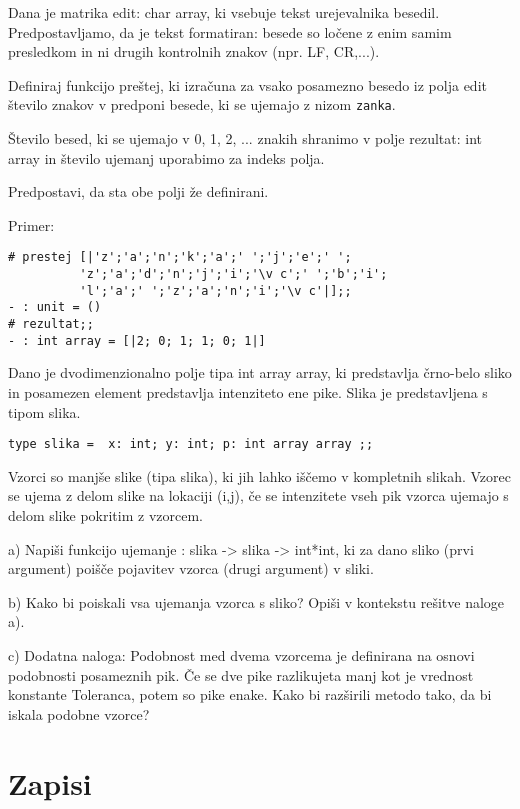 \begin{ex}
Dana je matrika edit: char array, ki vsebuje tekst urejevalnika besedil. Predpostavljamo, da je tekst formatiran: besede so lo\v cene z enim samim presledkom in ni drugih kontrolnih znakov (npr. LF, CR,...).

Definiraj funkcijo pre\v stej, ki izra\v cuna za vsako posamezno besedo iz polja edit \v stevilo znakov v predponi besede, ki se ujemajo z nizom \texttt{zanka}. 

\v Stevilo besed, ki se ujemajo v 0, 1, 2, ... znakih shranimo v polje rezultat: int array in \v stevilo ujemanj uporabimo za indeks polja. 

Predpostavi, da sta obe polji \v ze definirani.

Primer: \begin{verbatim} 
# prestej [|'z';'a';'n';'k';'a';' ';'j';'e';' ';
          'z';'a';'d';'n';'j';'i';'\v c';' ';'b';'i';
          'l';'a';' ';'z';'a';'n';'i';'\v c'|];;
- : unit = ()
# rezultat;;
- : int array = [|2; 0; 1; 1; 0; 1|]
\end{verbatim}


\end{ex}
\begin{ex}
Dano je dvodimenzionalno polje tipa int array array, ki predstavlja \v crno-belo sliko in posamezen element predstavlja intenziteto ene pike. Slika je predstavljena s tipom slika.

\texttt{type slika = { x: int; y: int; p: int array array };;} 

Vzorci so manj\v se slike (tipa slika), ki jih lahko i\v s\v cemo v kompletnih slikah. Vzorec se ujema z delom slike na lokaciji (i,j), \v ce se intenzitete vseh pik vzorca ujemajo s delom slike pokritim z vzorcem.

a) Napi\v si funkcijo ujemanje : slika -> slika -> int*int, ki za dano sliko (prvi argument) poi\v s\v ce pojavitev vzorca (drugi argument) v sliki.

b) Kako bi poiskali vsa ujemanja vzorca s sliko? Opi\v si v kontekstu re\v sitve naloge a).

c) Dodatna naloga: Podobnost med dvema vzorcema je definirana na osnovi podobnosti posameznih pik. \v Ce se dve pike razlikujeta manj kot je vrednost konstante Toleranca, potem so pike enake. Kako bi raz\v sirili metodo tako, da bi iskala podobne vzorce?
\end{ex}

\section{Zapisi}

